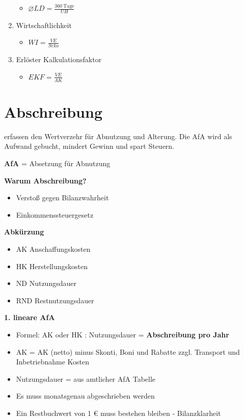 \begin{enumerate}
  \begin{itemize}
  \item
    $\boxed{\varnothing LD = \frac{360~\text{Tage}}{UH}}$
  \end{itemize}
\item
  Wirtschaftlichkeit

  \begin{itemize}
  \item
    $WI = \boxed{\frac{VE}{Seko}}$
  \end{itemize}
\item
  Erlöster Kalkulationsfaktor

  \begin{itemize}
  \item
    $EKF = \boxed{\frac{VE}{AK}}$
  \end{itemize}
\end{enumerate}

\newpage

\section{Abschreibung}\label{abschreibung}

erfassen den Wertverzehr für Abnutzung und Alterung. Die AfA wird als
Aufwand gebucht, mindert Gewinn und spart Steuern.

\textbf{AfA} = Absetzung für Abnutzung

\textbf{Warum Abschreibung?}

\begin{itemize}
\item
  Verstoß gegen Bilanzwahrheit
\item
  Einkommenssteuergesetz
\end{itemize}

\textbf{Abkürzung}

\begin{itemize}
\item
  AK Anschaffungskosten
\item
  HK Herstellungskosten
\item
  ND Nutzungsdauer
\item
  RND Restnutzungsdauer
\end{itemize}

\textbf{1. lineare AfA}

\begin{itemize}
\item
  Formel: AK oder HK : Nutzungsdauer = \textbf{Abschreibung pro Jahr}
\item
  AK = AK (netto) minus Skonti, Boni und Rabatte zzgl. Transport und
  Inbetriebnahme Kosten
\item
  Nutzungsdauer = aus amtlicher AfA Tabelle
\item
  Es muss monatsgenau abgeschrieben werden
\item
  Ein Restbuchwert von 1 € muss bestehen bleiben - Bilanzklarheit
\end{itemize}


